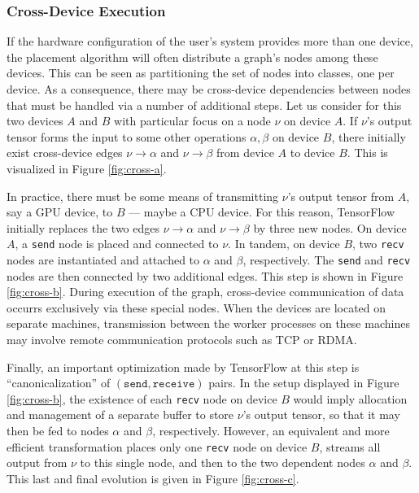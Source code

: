 \subsubsection{Cross-Device Execution}\label{sec:model-exec-single}

If the hardware configuration of the user's system provides more than one
device, the placement algorithm will often distribute a graph's nodes among
these devices. This can be seen as partitioning the set of nodes into classes,
one per device. As a consequence, there may be cross-device dependencies between
nodes that must be handled via a number of additional steps. Let us consider for
this two devices $A$ and $B$ with particular focus on a node $\nu$ on device
$A$. If $\nu$'s output tensor forms the input to some other operations
$\alpha, \beta$ on device $B$, there initially exist cross-device edges
$\nu \rightarrow \alpha$ and $\nu \rightarrow \beta$ from device $A$ to device
$B$. This is visualized in Figure \ref{fig:cross-a}.

In practice, there must be some means of transmitting $\nu$'s output tensor from
$A$, say a GPU device, to $B$ --- maybe a CPU device. For this reason,
TensorFlow initially replaces the two edges $\nu \rightarrow \alpha$ and
$\nu \rightarrow \beta$ by three new nodes. On device $A$, a \texttt{send} node
is placed and connected to $\nu$. In tandem, on device $B$, two \texttt{recv}
nodes are instantiated and attached to $\alpha$ and $\beta$, respectively. The
\texttt{send} and \texttt{recv} nodes are then connected by two additional
edges. This step is shown in Figure \ref{fig:cross-b}. During execution of the
graph, cross-device communication of data occurrs exclusively via these special
nodes. When the devices are located on separate machines, transmission between
the worker processes on these machines may involve remote communication
protocols such as TCP or RDMA.

Finally, an important optimization made by TensorFlow at this step is
``canonicalization'' of $(\mathtt{send}, \mathtt{receive})$ pairs. In the setup
displayed in Figure \ref{fig:cross-b}, the existence of each \texttt{recv} node
on device $B$ would imply allocation and management of a separate buffer to
store $\nu$'s output tensor, so that it may then be fed to nodes $\alpha$ and
$\beta$, respectively. However, an equivalent and more efficient transformation
places only one \texttt{recv} node on device $B$, streams all output from $\nu$
to this single node, and then to the two dependent nodes $\alpha$ and
$\beta$. This last and final evolution is given in Figure \ref{fig:cross-c}.

